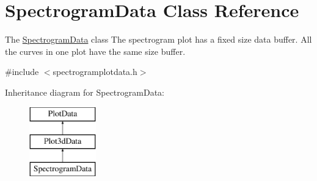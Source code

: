 \hypertarget{class_spectrogram_data}{\section{\-Spectrogram\-Data \-Class \-Reference}
\label{class_spectrogram_data}
}


\-The \hyperlink{class_spectrogram_data}{\-Spectrogram\-Data} class \-The spectrogram plot has a fixed size data buffer. \-All the curves in one plot have the same size buffer.  




{\ttfamily \#include $<$spectrogramplotdata.\-h$>$}

\-Inheritance diagram for \-Spectrogram\-Data\-:\begin{figure}[H]
\begin{center}
\leavevmode
\includegraphics[height=3.000000cm]{class_spectrogram_data}
\end{center}
\end{figure}
